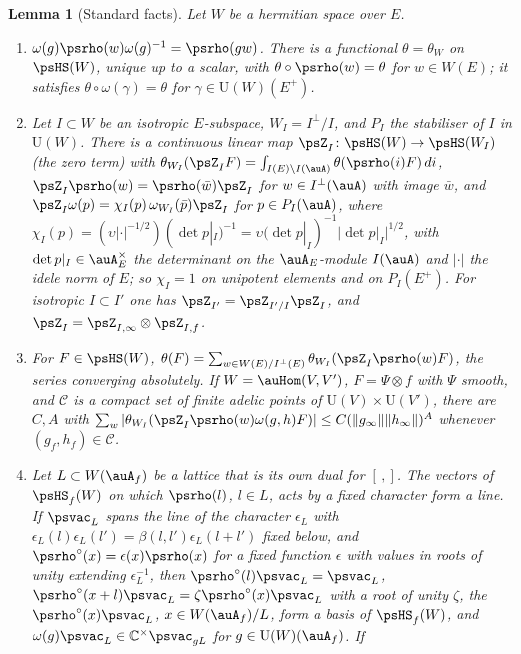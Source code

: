 \documentclass[10pt]{amsart}
\newtheorem{lemma}[theorem]{Lemma}
\theoremstyle{definition}
\theoremstyle{remark}
\newcommand{\C}{\mathbb C}
\providecommand{\auU}{\mathrm U}
\begin{document}
\begin{lemma}[Standard facts]\label{ps:weil}
Let $W$ be a hermitian space over $E$.
\begin{enumerate}
\item[(W1)] $\omega(g)\psrho(w)\omega(g)^{-1}=\psrho(gw)$. There is a functional $\theta=\theta_W$
on $\psHS(W)$, unique up to a scalar, with $\theta\circ\psrho(w)=\theta$ for $w\in W(E)$; it
satisfies $\theta\circ\omega(\gamma)=\theta$ for $\gamma\in\auU(W)(E^+)$.
\item[(W2)] Let $I\subset W$ be an isotropic $E$-subspace, $W_I=I^\perp/I$, and $P_I$ the stabiliser
of $I$ in $\auU(W)$. There is a continuous linear map $\psZ_I\colon\psHS(W)\to\psHS(W_I)$ (the
\emph{zero term}) with $\theta_{W_I}(\psZ_IF)=\int_{I(E)\backslash I(\auA)}\theta(\psrho(i)F)\,di$,
$\psZ_I\psrho(w)=\psrho(\bar w)\psZ_I$ for $w\in I^\perp(\auA)$ with image $\bar w$, and
$\psZ_I\omega(p)=\chi_I(p)\,\omega_{W_I}(\bar p)\psZ_I$ for $p\in P_I(\auA)$, where $\chi_I(p)=
(\upsilon|\cdot|^{-1/2})(\det p|_I)^{-1}=\upsilon(\det p|_I)^{-1}|\det p|_I|^{1/2}$, with
$\det p|_I\in\auA_E^\times$ the determinant on the $\auA_E$-module $I(\auA)$ and $|\cdot|$ the
idele norm of $E$; so $\chi_I=1$ on unipotent elements and on $P_I(E^+)$.
For isotropic $I\subset I'$ one has $\psZ_{I'}=\psZ_{I'/I}\psZ_I$, and $\psZ_I=\psZ_{I,\infty}
\otimes\psZ_{I,f}$.
\item[(W3)] For $F\in\psHS(W)$, $\theta(F)=\sum_{w\in W(E)/I^\perp(E)}\theta_{W_I}(\psZ_I\psrho(w)F)$,
the series converging absolutely. If $W=\auHom(V,V')$, $F=\Psi\otimes f$ with $\Psi$ smooth, and
$\mathcal C$ is a compact set of finite adelic points of $\auU(V)\times\auU(V')$, there are $C,A$ with
$\sum_w|\theta_{W_I}(\psZ_I\psrho(w)\omega(g,h)F)|\le C(\|g_\infty\|\|h_\infty\|)^A$ whenever
$(g_f,h_f)\in\mathcal C$.
\item[(W4)] Let $L\subset W(\auA_f)$ be a lattice that is its own dual for $[\,,]$. The vectors of
$\psHS_f(W)$ on which $\psrho(l)$, $l\in L$, acts by a fixed character form a line. If $\psvac_L$
spans the line of the character $\epsilon_L$ with $\epsilon_L(l)\epsilon_L(l')=\beta(l,l')
\epsilon_L(l+l')$ fixed below, and $\psrho^\circ(x)=\epsilon(x)\psrho(x)$ for a fixed function
$\epsilon$ with values in roots of unity extending $\epsilon_L^{-1}$, then
$\psrho^\circ(l)\psvac_L=\psvac_L$, $\psrho^\circ(x+l)\psvac_L=\zeta\psrho^\circ(x)\psvac_L$ with a
root of unity $\zeta$, the $\psrho^\circ(x)\psvac_L$, $x\in W(\auA_f)/L$, form a basis of
$\psHS_f(W)$, and $\omega(g)\psvac_L\in\C^\times\psvac_{gL}$ for $g\in\auU(W)(\auA_f)$. If

\end{enumerate}
\end{lemma}
\end{document}
